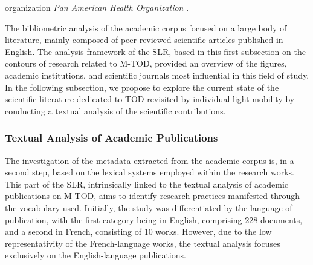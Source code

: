 \begin{refsegment}
organization \textsl{Pan American Health Organization} \textcolor{blue}{\autocite{cervero_influences_2009}}.%

The bibliometric analysis of the academic corpus focused on a large body of literature, mainly composed of peer-reviewed scientific articles published in English. The analysis framework of the \acrshort{SLR}, based in this first subsection on the contours of research related to \acrshort{M-TOD}, provided an overview of the figures, academic institutions, and scientific journals most influential in this field of study. In the following subsection, we propose to explore the current state of the scientific literature dedicated to \acrshort{TOD} revisited by individual light mobility by conducting a textual analysis of the scientific contributions.%

\subsubsection*{Textual Analysis of Academic Publications
    \label{chap2:analyse-textuelle}
    }

The investigation of the metadata extracted from the academic corpus is, in a second step, based on the lexical systems employed within the research works. This part of the \acrshort{SLR}, intrinsically linked to the textual analysis of academic publications on \acrshort{M-TOD}, aims to identify research practices manifested through the vocabulary used. Initially, the study was differentiated by the language of publication, with the first category being in English, comprising 228 documents, and a second in French, consisting of 10 works. However, due to the low representativity of the French-language works, the textual analysis focuses exclusively on the English-language publications.%


\end{refsegment}
